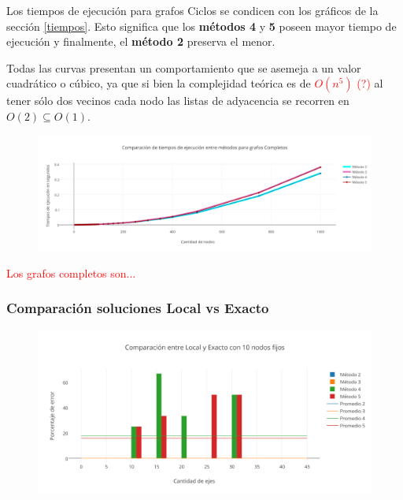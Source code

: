Los tiempos de ejecuci\'on para grafos Ciclos se condicen con los gr\'aficos de la secci\'on \ref{tiempos}. Esto significa que los \textbf{m\'etodos 4} y \textbf{5} poseen mayor tiempo de ejecuci\'on y finalmente, el \textbf{m\'etodo 2} preserva el menor.

Todas las curvas presentan un comportamiento que se asemeja a un valor cuadr\'atico  o c\'ubico, ya que si bien la complejidad te\'orica es de \textcolor{red}{$O(n^5)$ (?)} al tener s\'olo dos vecinos cada nodo las listas de adyacencia se recorren en $O(2)\subseteq O(1)$.
 
   \begin{figure}[h!]
   \begin{center}
 	\includegraphics[scale=0.55]{imagenes/local/tiempos/completos.png}
   \end{center}
 \end{figure} 
 
\textcolor{red}{Los grafos completos son... } 
 
\newpage
\subsubsection{Comparaci\'on soluciones Local vs Exacto}

  \begin{figure}[h!]
   \begin{center}
 	\includegraphics[scale=0.75]{imagenes/local/exacto/10nodos.png}
   \end{center}
 \end{figure}

